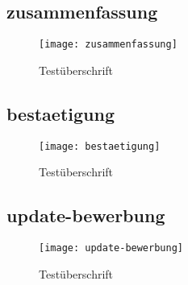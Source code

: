 \begin{landscape}
\subsection{zusammenfassung}
\begin{figure}[H]
    \centering
    \caption{Testüberschrift}
    \begin{adjustbox}{width=\linewidth, center}
        \texttt{[image: zusammenfassung]}
    \end{adjustbox}
\end{figure}

\subsection{bestaetigung}
\begin{figure}[H]
    \centering
    \caption{Testüberschrift}
    \begin{adjustbox}{width=\linewidth, center}
        \texttt{[image: bestaetigung]}
    \end{adjustbox}
\end{figure}

\subsection{update-bewerbung}
\begin{figure}[H]
    \centering
    \caption{Testüberschrift}
    \begin{adjustbox}{width=\linewidth, center}
        \texttt{[image: update-bewerbung]}
    \end{adjustbox}
\end{figure}

\end{landscape}
